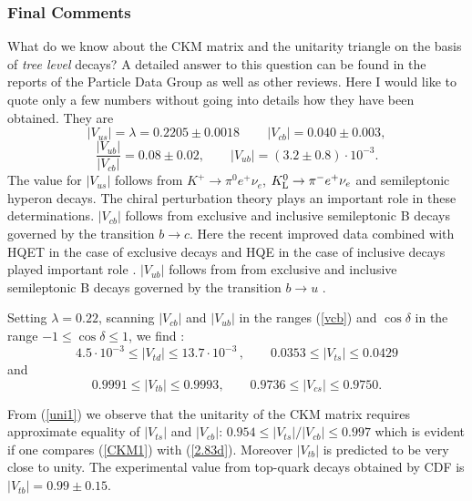 \documentclass[12pt,rotate]{article}
\newcommand{\vcb}{|V_{cb}|}
\newcommand{\vtd}{|V_{td}|}
\newcommand{\vts}{|V_{ts}|}
\begin{document}
\begin{itemize}
\subsubsection{Final Comments}
What do we know about the CKM matrix and the unitarity triangle on the
basis of {\it tree level} decays? A detailed answer to this question
can be found in the reports of
the Particle Data Group \cite{PDG} as well as other reviews.
Here I would like to quote only a few numbers without going into
details how they have been obtained. They are
\begin{equation}\label{vcb}
|V_{us}| = \lambda =  0.2205 \pm 0.0018\,
\quad\quad
\vcb=0.040\pm0.003,
\end{equation}
\begin{equation}\label{v13}
\frac{|V_{ub}|}{\vcb}=0.08\pm0.02, \quad\quad
|V_{ub}|=(3.2\pm0.8)\cdot 10^{-3}.
\end{equation}
The value for $|V_{us}|$ follows from 
$K^+\to \pi^0 e^+ \nu_e$, $K_{\rm L}^0 \to\pi^-e^+ \nu_e$ and
semileptonic hyperon decays. The chiral perturbation theory
\cite{LER1,DHK} plays an important role in these determinations.
$\vcb$ follows from exclusive and inclusive semileptonic B decays
governed by the transition $b \to c$. 
Here the recent improved data \cite{Gibbons} combined with
 HQET in the case of exclusive decays and HQE in the case of
inclusive decays played important role \cite{SUV,Neubert,Braun,CZMI}.
$|V_{ub}|$ follows from from exclusive and inclusive semileptonic B decays
governed by the transition $b \to u$
\cite{Gibbons,CLEOU}.

Setting $\lambda=0.22$, scanning $\vcb$ and $|V_{ub}|$ in
the ranges (\ref{vcb})  and $\cos\delta$ in
the range $-1\leq \cos\delta\leq 1$, we find \cite{BF97}:
\begin{equation}\label{uni1}
4.5\cdot 10^{-3}\leq \vtd \leq 13.7\cdot 10^{-3}\,,
\qquad
0.0353\leq \vts \leq 0.0429
\end{equation}
and
\begin{equation}\label{uni2}
0.9991\leq |V_{tb}| \leq 0.9993,
\qquad
0.9736\leq |V_{cs}| \leq 0.9750.
\end{equation}

From (\ref{uni1}) we observe
that the unitarity of the CKM matrix requires approximate equality of 
$\vts$ and $\vcb$:
$0.954\leq |V_{ts}|/\vcb \leq 0.997$
which is evident if one compares (\ref{CKM1}) with (\ref{2.83d}).
Moreover $|V_{tb}|$ is predicted to be very close to unity.
The experimental value from top-quark decays obtained by CDF is
$|V_{tb}|=0.99\pm 0.15$.


\end{itemize}
\end{document}
